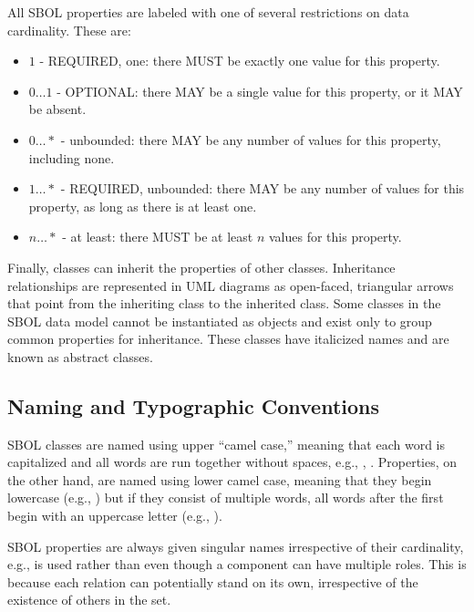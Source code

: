 All SBOL properties are labeled with one of several restrictions on data cardinality. These are:

\begin{itemize}

\item $1$ - REQUIRED, one: there MUST be exactly one value for this property.

\item $0 \ldots 1$ - OPTIONAL: there MAY be a single value for this property, or it MAY be absent.

\item $0 \ldots *$ - unbounded: there MAY be any number of values for this property, including none.

\item $1 \ldots *$ - REQUIRED, unbounded: there MAY be any number of values for this property, as long as there is at least one.

\item $n \ldots *$ - at least: there MUST be at least $n$ values for this property.

\end{itemize}

Finally, classes can inherit the properties of other classes. Inheritance relationships are represented in UML diagrams as open-faced, triangular arrows that point from the inheriting class to the inherited class. Some classes in the SBOL data model cannot be instantiated as objects and exist only to group common properties for inheritance. These classes have italicized names and are known as abstract classes.

\subsection{Naming and Typographic Conventions}
\label{sec:nameconventions}

SBOL classes are named using upper ``camel case,'' meaning that each word is capitalized and all words are run together without spaces, e.g., , .
Properties, on the other hand, are named using lower camel case, meaning that they begin lowercase (e.g., ) but if they consist of multiple words, all words after the first begin with an uppercase letter (e.g., ).

SBOL properties are always given singular names irrespective of their cardinality, e.g.,  is used rather than  even though a component can have multiple roles.
This is because each relation can potentially stand on its own, irrespective of the existence of others in the set.

